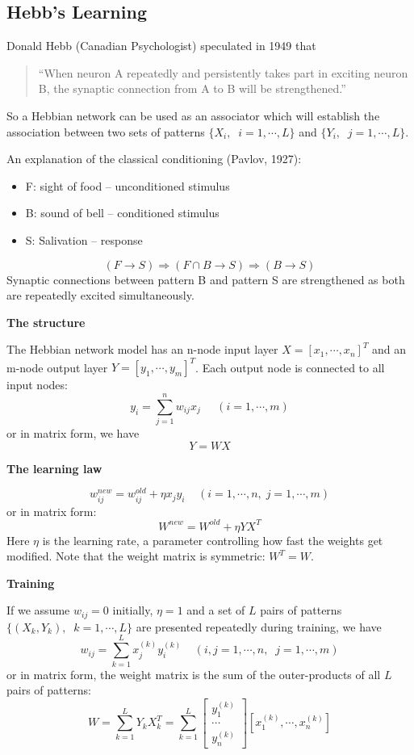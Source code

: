 \newpage
\subsection*{Hebb's Learning}

Donald Hebb (Canadian Psychologist) speculated in 1949 that 
\begin{quote}
``When neuron A repeatedly and persistently takes part in exciting neuron B, 
the synaptic connection from A to B will be strengthened.'' 
\end{quote}
So a Hebbian network can be used as an associator which will establish the 
association between two sets of patterns
$\{X_i,\;\;i=1,\cdots,L \}$ and $\{Y_i,\;\;j=1,\cdots,L\}$.

An explanation of the classical conditioning  (Pavlov, 1927):

\begin{itemize}
	\item F: sight of food -- unconditioned stimulus
	\item B: sound of bell -- conditioned stimulus
	\item S: Salivation -- response
\end{itemize}

\[	(F \rightarrow S) \Rightarrow (F \cap B \rightarrow S) \Rightarrow 
	(B \rightarrow S)
\]
Synaptic connections between pattern B and pattern S are strengthened as both 
are repeatedly excited simultaneously. 

{\bf The structure}

	
The Hebbian network model has an n-node input layer $X=[x_1,\cdots,x_n]^T$ and 
an m-node output layer $Y=[y_1,\cdots,y_m]^T$. Each output node is connected
to all input nodes:
\[	y_i=\sum_{j=1}^n w_{ij} x_j\;\;\;\;\;(i=1,\cdots,m)	\]
or in matrix form, we have
\[	Y=WX	\]

{\bf The learning law}

\[
w_{ij}^{new}=w_{ij}^{old}+\eta x_j y_i\;\;\;\;(i=1,\cdots,n,\;j=1,\cdots,m)
\]
or in matrix form:
\[	W^{new}=W^{old}+\eta Y X^T	\]
Here $\eta$ is the learning rate, a parameter controlling how fast the
weights get modified. Note that the weight matrix is symmetric: $W^T=W$.

{\bf Training}

If we assume $w_{ij}=0$ initially, $\eta=1$ and a set of $L$ pairs of patterns 
$\{ (X_k,Y_k),\;\;k=1,\cdots,L \}$ are presented repeatedly during training,
we have
\[ w_{ij}=\sum_{k=1}^Lx_j^{(k)}y_i^{(k)}\;\;\;\;(i,j=1,\cdots,n,
	\;\;j=1,\cdots,m) \]
or in matrix form, the weight matrix is the sum of the outer-products of all
$L$ pairs of patterns:
\[	W=\sum_{k=1}^L Y_k X_k^T = \sum_{k=1}^L 
   \left[ \begin{array}{c} y_1^{(k)} \\ \cdots \\ y_n^{(k)} \end{array} \right]
   [ x_1^{(k)}, \cdots, x_n^{(k)} ]	\]

